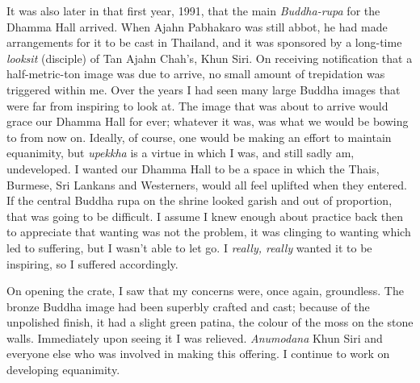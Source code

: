 It was also later in that first year, 1991, that the main
\emph{Buddha-rupa} for the Dhamma Hall arrived. When Ajahn Pabhakaro was
still abbot, he had made arrangements for it to be cast in Thailand, and
it was sponsored by a long-time \emph{looksit} (disciple) of Tan Ajahn
Chah's, Khun Siri. On receiving notification that a half-metric-ton
image was due to arrive, no small amount of trepidation was triggered
within me. Over the years I had seen many large Buddha images that were
far from inspiring to look at. The image that was about to arrive would
grace our Dhamma Hall for ever; whatever it was, was what we would be
bowing to from now on. Ideally, of course, one would be making an effort
to maintain equanimity, but \emph{upekkha} is a virtue in which I was,
and still sadly am, undeveloped. I wanted our Dhamma Hall to be a space
in which the Thais, Burmese, Sri Lankans and Westerners, would all feel
uplifted when they entered. If the central Buddha rupa on the shrine
looked garish and out of proportion, that was going to be difficult. I
assume I knew enough about practice back then to appreciate that wanting
was not the problem, it was clinging to wanting which led to suffering,
but I wasn't able to let go. I \emph{really, really} wanted it to be
inspiring, so I suffered accordingly.

On opening the crate, I saw that my concerns were, once again,
groundless. The bronze Buddha image had been superbly crafted and cast;
because of the unpolished finish, it had a slight green patina, the
colour of the moss on the stone walls. Immediately upon seeing it I was
relieved. \emph{Anumodana} Khun Siri and everyone else who was involved
in making this offering. I continue to work on developing
equanimity.

